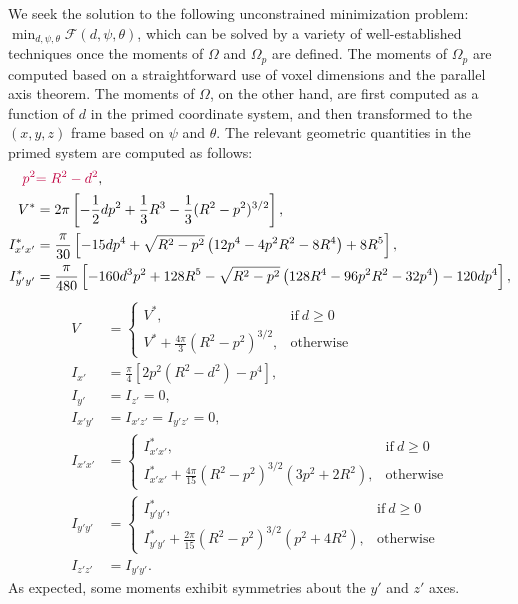 We seek the solution to the following unconstrained minimization problem: $\displaystyle \min_{d, \psi, \theta} \mathcal{F}(d,\psi,\theta)$, which can be solved by a variety of well-established techniques once the moments of $\Omega$ and $\Omega_p$ are defined. The moments of $\Omega_p$ are computed based on a straightforward use of voxel dimensions and the parallel axis theorem. The moments of $\Omega$, on the other hand, are first computed as a function of $d$ in the primed coordinate system, and then transformed to the $(x, y, z)$ frame based on $\psi$ and $\theta$. The relevant geometric quantities in the primed system are computed as follows:
\begin{align}
\color{purple}{p^2} &\color{purple}{= R^2 - d^2}\color{black}{,} \\
V^* &= 2\pi\left[-\frac{1}{2}dp^2 + \frac{1}{3}R^3 - \frac{1}{3}(R^2 - p^2)^{3/2} \right], \\
I^*_{x'x'} &= \frac{\pi}{30}\left[-15dp^4 + \sqrt{R^2-p^2}\left(12p^4 - 4p^2R^2 - 8R^4\right) + 8R^5 \right], \\
I^*_{y'y'} &= \frac{\pi}{480}\left[-160d^3p^2 + 128R^5 - \sqrt{R^2-p^2}\left(128R^4 - 96p^2R^2 - 32p^4\right) - 120dp^4 \right],
\end{align}
\begin{align} 
V &=  \begin{cases}
      V^*, & \text{if}\ d \geq 0 \\
      V^* + \frac{4\pi}{3}\left(R^2-p^2\right)^{3/2}, & \text{otherwise}
    \end{cases}\\
I_{x'} &= \frac{\pi}{4}\left[2p^2(R^2-d^2) - p^4 \right],\\
I_{y'} &= I_{z'} = 0, \\
I_{x'y'} &= I_{x'z'} = I_{y'z'} = 0, \\
I_{x'x'} &=  \begin{cases}
      I^*_{x'x'}, & \text{if}\ d \geq 0 \\
       I^*_{x'x'} + \frac{4\pi}{15}(R^2-p^2)^{3/2}(3p^2+2R^2), & \text{otherwise}
    \end{cases} \\
I_{y'y'} &=  \begin{cases}
     I^*_{y'y'}, & \text{if}\ d \geq 0 \\
     I^*_{y'y'} + \frac{2\pi}{15}(R^2-p^2)^{3/2}(p^2+4R^2), & \text{otherwise}
    \end{cases} \\
I_{z'z'} &= I_{y'y'}.
\end{align}
As expected, some moments exhibit symmetries about the $y'$ and $z'$ axes. \\ \\

